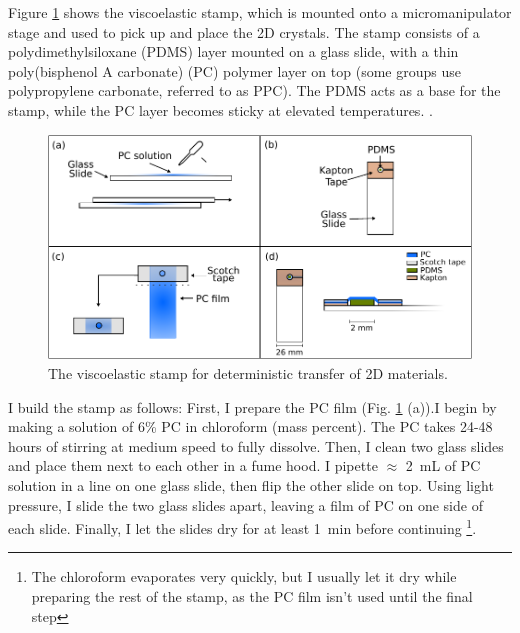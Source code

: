 \documentclass[double,12pt,1in]{beavtex}
\begin{document}
Figure \ref{stamp diagram} shows the viscoelastic stamp, which is mounted onto a micromanipulator stage and used to pick up and place the 2D crystals. The stamp consists of a polydimethylsiloxane (PDMS) layer mounted on a glass slide, with a thin poly(bisphenol A carbonate) (PC) polymer layer on top (some groups use polypropylene carbonate, referred to as PPC). The PDMS acts as a base for the stamp, while the PC layer becomes sticky at elevated temperatures. .


\begin{figure}
    \includegraphics[width = 1\textwidth]{stamp making diagram.pdf}
    \caption{The viscoelastic stamp for deterministic transfer of 2D materials.}
    \label{stamp diagram}
\end{figure}


I build the stamp as follows: First, I prepare the PC film (Fig. \ref{stamp diagram} (a)).I begin by making a solution of 6\% PC in chloroform (mass percent). The PC takes 24-48 hours of stirring at medium speed to fully dissolve. Then, I clean two glass slides and place them next to each other in a fume hood. I pipette $\approx$ \SI{2}{\milli\liter} of PC solution in a line on one glass slide, then flip the other slide on top. Using light pressure, I slide the two glass slides apart, leaving a film of PC on one side of each slide. Finally, I let the slides dry for at least \SI{1}{\minute} before continuing \footnote{The chloroform evaporates very quickly, but I usually let it dry while preparing the rest of the stamp, as the PC film isn't used until the final step}.
\end{document}
